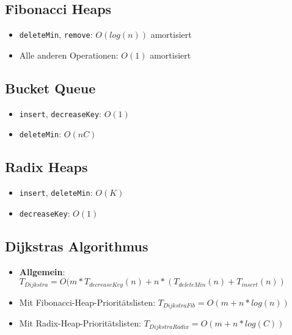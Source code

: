 \documentclass[10pt,a4paper]{article}
\begin{document}
	\subsection{Fibonacci Heaps}
	\label{lz:sub:fibonacci_heaps}
	
	\begin{itemize}
		\item \texttt{deleteMin}, \texttt{remove}: $O(log (n))$ amortisiert
		\item Alle anderen Operationen: $O(1)$ amortisiert
	\end{itemize}

	\subsection{Bucket Queue}
	\label{lz:sub:bucket_queue}
	
	\begin{itemize}
		\item \texttt{insert}, \texttt{decreaseKey}: $O(1)$
		\item \texttt{deleteMin}: $O(nC)$
	\end{itemize}

	\subsection{Radix Heaps}
	\label{lz:sub:radix_heaps}
	
	\begin{itemize}
		\item \texttt{insert}, \texttt{deleteMin}: $O(K)$
		\item \texttt{decreaseKey}: $O(1)$
	\end{itemize}

	\subsection{Dijkstras Algorithmus}
	\label{lz:sub:dijkstras_algorithmus}
	
	\begin{itemize}
		\item \textbf{Allgemein}: $T_{Dijkstra} = O(m * T_{decreaseKey}(n) + n * (T_{deleteMin}(n) + T_{insert}(n))$
		\item Mit Fibonacci-Heap-Prioritätslisten: $T_{DijkstraFib} = O(m + n * log (n))$
		\item Mit Radix-Heap-Prioritätslisten: $T_{DijkstraRadix} = O(m + n * log (C))$
	\end{itemize}
\end{document}
